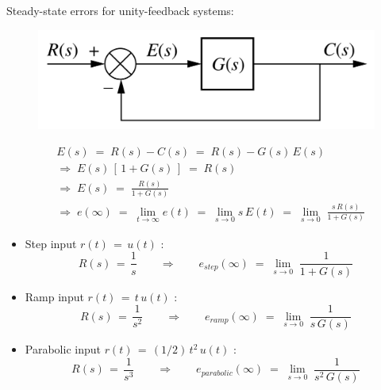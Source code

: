 \documentclass[ 10pt, xcolor = dvipsnames]{beamer}
\begin{document}
\begin{frame}[allowframebreaks]
\frametitle{\insertsection}

Steady-state errors for unity-feedback systems: 
\fullskip

\begin{figure}
\centering
\includegraphics[width=0.5\columnwidth]{figures/Nise_Fig-7-3b.jpg}
\end{figure}
\begin{align*}
& E(s) \; = \; R(s) - C(s) \; = \; R(s) - G(s) \, E(s) \\[1ex]
& \Longrightarrow \; E(s) \, [ \, 1 + G(s) \, ] \; = \; R(s) \\[1ex]
& \Longrightarrow \; E(s) \; = \; \frac{R(s)}{1 + G(s)} \\[1ex]
& \Longrightarrow \; e(\infty) \; = \; 
\lim_{ t \rightarrow \infty } e(t) \; = \; 
\lim_{ s \rightarrow 0 } s \, E(t) \; = \; 
\lim_{ s \rightarrow 0 } \; \frac{ s \, R(s) }{1 + G(s)}
\end{align*}
\framebreak

\begin{itemize}
\item Step input $r(t) \, = \, u(t)$ :
\[
R(s) \, = \, \frac{1}{s} \qquad \Longrightarrow \qquad
e_{step}(\infty) \; = \; 
\lim_{ s \rightarrow 0 } \; \frac{1}{1 + G(s)}
\]
\item Ramp input $r(t) \, = \, t \, u(t)$ :
\[
R(s) \, = \, \frac{1}{s^2} \qquad \Longrightarrow \qquad
e_{ramp}(\infty) \; = \; 
\lim_{ s \rightarrow 0 } \; \frac{1}{s \, G(s)}
\]
\item Parabolic input $r(t) \, = \, (1/2) \, t^2 \, u(t)$ :
\[
R(s) \, = \, \frac{1}{s^3} \qquad \Longrightarrow \qquad
e_{parabolic}(\infty) \; = \; 
\lim_{ s \rightarrow 0 } \; \frac{1}{s^2 \, G(s)}
\]
\end{itemize}

\end{frame}
\end{document}
